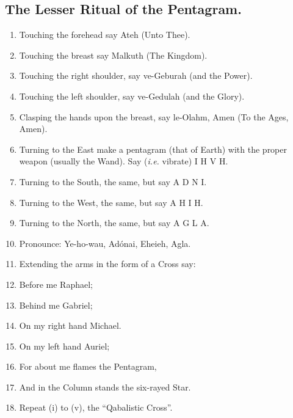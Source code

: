\subsection*{The Lesser Ritual of the Pentagram.}
\begin{enumerate}[label=(\Roman*)]
\item Touching the forehead say Ateh (Unto Thee).
\item Touching the breast say Malkuth (The Kingdom).
\item Touching the right shoulder, say ve-Geburah (and the Power).
\item Touching the left shoulder, say ve-Gedulah (and the Glory).
\item Clasping the hands upon the breast, say le-Olahm, Amen (To the Ages, Amen).
\item Turning to the East make a pentagram (that of Earth) with the proper weapon (usually the Wand). Say (\textit{i.e.} vibrate) \linebreak[2] I H V H.
\item Turning to the South, the same, but say \linebreak[2] A D N I.
\item Turning to the West, the same, but say \linebreak[2] A H I H.
\item Turning to the North, the same, but say \linebreak[2] A G L A.
\item[] Pronounce: Ye-ho-wau, Ad\'{o}nai, Eheieh, Agla.
\item Extending the arms in the form of a Cross say:
\item Before me Raphael;
\item Behind me Gabriel;
\item On my right hand Michael.
\item On my left hand Auriel;
\item For about me flames the Pentagram,
\item And in the Column stands the six-rayed Star.
\item[] Repeat (i) to (v), the \enquote{Qabalistic Cross}.
\end{enumerate}

